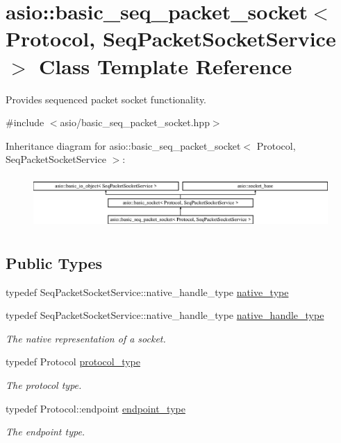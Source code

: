\hypertarget{classasio_1_1basic__seq__packet__socket}{}\section{asio\+:\+:basic\+\_\+seq\+\_\+packet\+\_\+socket$<$ Protocol, Seq\+Packet\+Socket\+Service $>$ Class Template Reference}
\label{classasio_1_1basic__seq__packet__socket}


Provides sequenced packet socket functionality.  




{\ttfamily \#include $<$asio/basic\+\_\+seq\+\_\+packet\+\_\+socket.\+hpp$>$}

Inheritance diagram for asio\+:\+:basic\+\_\+seq\+\_\+packet\+\_\+socket$<$ Protocol, Seq\+Packet\+Socket\+Service $>$\+:\begin{figure}[H]
\begin{center}
\leavevmode
\includegraphics[height=2.033898cm]{classasio_1_1basic__seq__packet__socket}
\end{center}
\end{figure}
\subsection*{Public Types}
\begin{DoxyCompactItemize}
\item 
typedef Seq\+Packet\+Socket\+Service\+::native\+\_\+handle\+\_\+type \hyperlink{classasio_1_1basic__seq__packet__socket_ad1bba59e6063a95b9449d847dec117db}{native\+\_\+type}
\item 
typedef Seq\+Packet\+Socket\+Service\+::native\+\_\+handle\+\_\+type \hyperlink{classasio_1_1basic__seq__packet__socket_aab4f35462c8d5eecf380d50336984ccd}{native\+\_\+handle\+\_\+type}
\begin{DoxyCompactList}\small\item\em The native representation of a socket. \end{DoxyCompactList}\item 
typedef Protocol \hyperlink{classasio_1_1basic__seq__packet__socket_a683a8578f6465370482fd9f3b51ac0ea}{protocol\+\_\+type}
\begin{DoxyCompactList}\small\item\em The protocol type. \end{DoxyCompactList}\item 
typedef Protocol\+::endpoint \hyperlink{classasio_1_1basic__seq__packet__socket_ad5f8549d940cf2c9325b02398910e98f}{endpoint\+\_\+type}
\begin{DoxyCompactList}\small\item\em The endpoint type. \end{DoxyCompactList}\end{DoxyCompactItemize}
